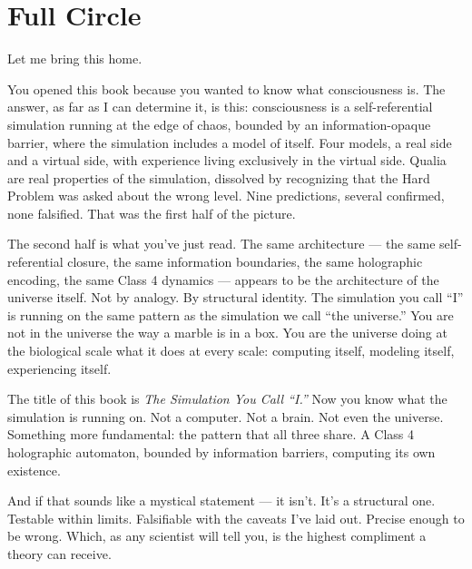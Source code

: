 \documentclass[11pt, twoside, openright]{book}
\begin{document}
\section*{Full Circle}

Let me bring this home.

You opened this book because you wanted to know what consciousness is. The answer, as far as I can determine it, is this: consciousness is a self-referential simulation running at the edge of chaos, bounded by an information-opaque barrier, where the simulation includes a model of itself. Four models, a real side and a virtual side, with experience living exclusively in the virtual side. Qualia are real properties of the simulation, dissolved by recognizing that the Hard Problem was asked about the wrong level. Nine predictions, several confirmed, none falsified. That was the first half of the picture.

The second half is what you've just read. The same architecture --- the same self-referential closure, the same information boundaries, the same holographic encoding, the same Class 4 dynamics --- appears to be the architecture of the universe itself. Not by analogy. By structural identity. The simulation you call ``I'' is running on the same pattern as the simulation we call ``the universe.'' You are not in the universe the way a marble is in a box. You are the universe doing at the biological scale what it does at every scale: computing itself, modeling itself, experiencing itself.

The title of this book is \textit{The Simulation You Call ``I.''} Now you know what the simulation is running on. Not a computer. Not a brain. Not even the universe. Something more fundamental: the pattern that all three share. A Class 4 holographic automaton, bounded by information barriers, computing its own existence.

And if that sounds like a mystical statement --- it isn't. It's a structural one. Testable within limits. Falsifiable with the caveats I've laid out. Precise enough to be wrong. Which, as any scientist will tell you, is the highest compliment a theory can receive.
\end{document}
